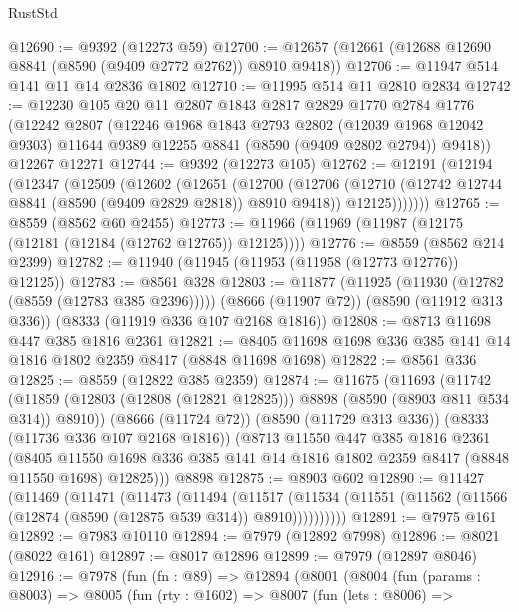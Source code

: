 \begin{lexlean}{RustStd}
\begin{coremodule}
@12690 := @9392 (@12273 @59)
@12700 := @12657 (@12661 (@12688 @12690 @8841 (@8590 (@9409 @2772 @2762)) @8910 @9418))
@12706 := @11947 @514 @141 @11 @14 @2836 @1802
@12710 := @11995 @514 @11 @2810 @2834
@12742 := @12230
    @105
    @20
    @11
    @2807
    @1843
    @2817
    @2829
    @1770
    @2784
    @1776
    (@12242
      @2807
      (@12246
        @1968
        @1843
        @2793
        @2802
        (@12039 @1968 @12042 @9303)
        @11644
        @9389
        @12255
        @8841
        (@8590 (@9409 @2802 @2794))
        @9418))
    @12267
    @12271
@12744 := @9392 (@12273 @105)
@12762 := @12191
    (@12194
      (@12347
        (@12509
          (@12602
            (@12651
              (@12700
                (@12706
                  (@12710 (@12742 @12744 @8841 (@8590 (@9409 @2829 @2818)) @8910 @9418))
                  @12125)))))))
@12765 := @8559 (@8562 @60 @2455)
@12773 := @11966 (@11969 (@11987 (@12175 (@12181 (@12184 (@12762 @12765)) @12125))))
@12776 := @8559 (@8562 @214 @2399)
@12782 := @11940 (@11945 (@11953 (@11958 (@12773 @12776)) @12125))
@12783 := @8561 @328
@12803 := @11877
    (@11925 (@11930 (@12782 (@8559 (@12783 @385 @2396)))))
    (@8666 (@11907 @72))
    (@8590 (@11912 @313 @336))
    (@8333 (@11919 @336 @107 @2168 @1816))
@12808 := @8713 @11698 @447 @385 @1816 @2361
@12821 := @8405 @11698 @1698 @336 @385 @141 @14 @1816 @1802 @2359 @8417 (@8848 @11698 @1698)
@12822 := @8561 @336
@12825 := @8559 (@12822 @385 @2359)
@12874 := @11675
    (@11693
      (@11742 (@11859 (@12803 (@12808 (@12821 @12825))) @8898 (@8590 (@8903 @811 @534 @314)) @8910))
      (@8666 (@11724 @72))
      (@8590 (@11729 @313 @336))
      (@8333 (@11736 @336 @107 @2168 @1816))
      (@8713
        @11550
        @447
        @385
        @1816
        @2361
        (@8405
          @11550
          @1698
          @336
          @385
          @141
          @14
          @1816
          @1802
          @2359
          @8417
          (@8848 @11550 @1698)
          @12825)))
    @8898
@12875 := @8903 @602
@12890 := @11427
    (@11469
      (@11471
        (@11473
          (@11494
            (@11517
              (@11534 (@11551 (@11562 (@11566 (@12874 (@8590 (@12875 @539 @314)) @8910))))))))))
@12891 := @7975 @161
@12892 := @7983 @10110
@12894 := @7979 (@12892 @7998)
@12896 := @8021 (@8022 @161)
@12897 := @8017 @12896
@12899 := @7979 (@12897 @8046)
@12916 := @7978
    (fun (fn : @89) =>
    @12894
      (@8001
        (@8004
          (fun (params : @8003) =>
          @8005
            (fun (rty : @1602) =>
            @8007
              (fun (lets : @8006) =>

\end{coremodule}
\end{lexlean}

